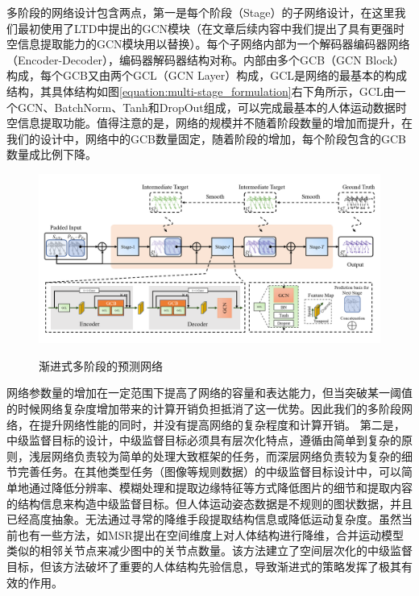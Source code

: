 多阶段的网络设计包含两点，第一是每个阶段（Stage）的子网络设计，在这里我们最初使用了LTD中提出的GCN模块（在文章后续内容中我们提出了具有更强时空信息提取能力的GCN模块用以替换）。\textcolor[rgb]{1,0,0}{每个子网络内部为一个解码器编码器网络（Encoder-Decoder），}编码器解码器结构对称。内部由多个GCB（GCN Block）构成，每个GCB又由两个GCL（GCN Layer）构成，GCL是网络的最基本的构成结构，其具体结构如图\ref{equation:multi-stage_formulation}右下角所示，GCL由一个GCN、BatchNorm、Tanh和DropOut组成，可以完成最基本的人体运动数据时空信息提取功能。值得注意的是，网络的规模并不随着阶段数量的增加而提升，在我们的设计中，网络中的GCB数量固定，随着阶段的增加，每个阶段包含的GCB数量成比例下降。
\begin{figure}[ht]
    \centering
    \includegraphics[width=1\textwidth]{FigMa/multi-stage_network.png}\\
    \vspace{-0.3cm}
    \caption{渐进式多阶段的预测网络}
    \label{fig:multi_stage}
\end{figure}
网络参数量的增加在一定范围下提高了网络的容量和表达能力，但当突破某一阈值的时候网络复杂度增加带来的计算开销负担抵消了这一优势。因此我们的多阶段网络，在提升网络性能的同时，并没有提高网络的复杂程度和计算开销。
第二是，中级监督目标的设计，中级监督目标必须具有层次化特点，遵循由简单到复杂的原则，浅层网络负责较为简单的处理大致框架的任务，而深层网络负责较为复杂的细节完善任务。在其他类型任务（图像等规则数据）的中级监督目标设计中，可以简单地通过降低分辨率、模糊处理和提取边缘特征等方式降低图片的细节和提取内容的结构信息来构造中级监督目标。但人体运动姿态数据是不规则的图状数据，并且已经高度抽象。无法通过寻常的降维手段提取结构信息或降低运动复杂度。虽然当前也有一些方法，如MSR\parencite{dang2021msr}提出在空间维度上对人体结构进行降维，合并运动模型类似的相邻关节点来减少图中的关节点数量。该方法建立了空间层次化的中级监督目标，但该方法破坏了重要的人体结构先验信息，导致渐进式的策略发挥了极其有效的作用。

